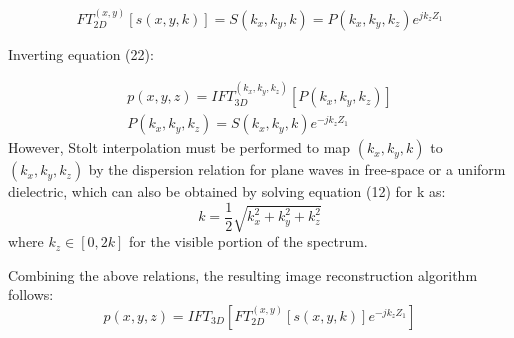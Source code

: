\documentclass{IEEEtran}
\begin{document}
\begin{equation}
	FT_{2D}^{(x,y)}[s(x,y,k)] = S(k_x,k_y,k) = P(k_x,k_y,k_z)e^{jk_z Z_1}
\end{equation}

Inverting equation (22):

\begin{gather}
	p(x,y,z) = IFT_{3D}^{(k_x,k_y,k_z)}[P(k_x,k_y,k_z)] \\
	P(k_x,k_y,k_z) = S(k_x,k_y,k)e^{-jk_zZ_1}
\end{gather}
However, Stolt interpolation must be performed to map $(k_x,k_y,k)$ to $(k_x,k_y,k_z)$ by the dispersion relation for plane waves in free-space or a uniform dielectric, which can also be obtained by solving equation (12) for k as:
\begin{equation}
	k = \frac{1}{2}\sqrt{k_x^2+k_y^2+k_z^2}
\end{equation}
where $k_z \in [0,2k]$ for the visible portion of the spectrum.

Combining the above relations, the resulting image reconstruction algorithm follows:
\begin{equation}
	p(x,y,z) = IFT_{3D}\left[ FT_{2D}^{(x,y)}[s(x,y,k)] e^{-jk_zZ_1} \right]
\end{equation}
\end{document}
